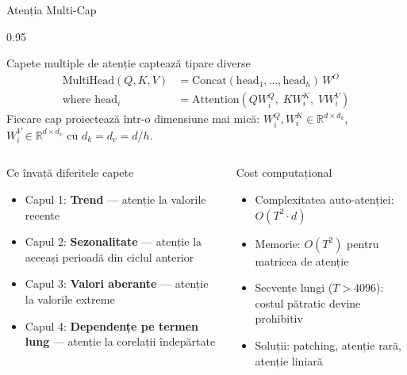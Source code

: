 \documentclass[9pt, aspectratio=169, t]{beamer}
\begin{document}
\begin{frame}{Atenția Multi-Cap}
    \begin{cminipage}{0.95\textwidth}
    \vspace{-3mm}
    \begin{block}{Capete multiple de atenție captează tipare diverse}
        \vspace{-2mm}
        \begin{align*}
            \text{MultiHead}(Q,K,V) &= \text{Concat}(\text{head}_1, \ldots, \text{head}_h)\, W^O \\
            \text{where head}_i &= \text{Attention}(QW_i^Q,\; KW_i^K,\; VW_i^V)
        \end{align*}
        \vspace{-4mm}
        {\scriptsize Fiecare cap proiectează într-o dimensiune mai mică: $W_i^Q, W_i^K \in \mathbb{R}^{d \times d_k}$, $W_i^V \in \mathbb{R}^{d \times d_v}$ cu $d_k = d_v = d/h$.}
    \end{block}

    \vspace{-2mm}

    \begin{columns}[T]
        \begin{exampleblock}{Ce învață diferitele capete}
            {\scriptsize
            \begin{itemize}\setlength{\itemsep}{0pt}
                \item Capul 1: \textbf{Trend} --- atenție la valorile recente
                \item Capul 2: \textbf{Sezonalitate} --- atenție la aceeași perioadă din ciclul anterior
                \item Capul 3: \textbf{Valori aberante} --- atenție la valorile extreme
                \item Capul 4: \textbf{Dependențe pe termen lung} --- atenție la corelații îndepărtate
            \end{itemize}
            }
        \end{exampleblock}

        \begin{alertblock}{Cost computațional}
            {\scriptsize
            \begin{itemize}\setlength{\itemsep}{0pt}
                \item Complexitatea auto-atenției: $O(T^2 \cdot d)$
                \item Memorie: $O(T^2)$ pentru matricea de atenție
                \item Secvențe lungi ($T > 4096$): costul pătratic devine prohibitiv
                \item Soluții: patching, atenție rară, atenție liniară
            \end{itemize}
            }
        \end{alertblock}
    \end{columns}
    \end{cminipage}
\end{frame}
\end{document}
